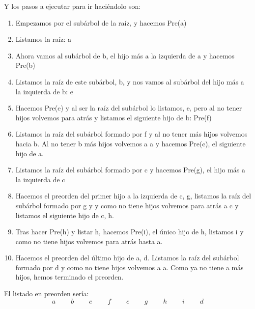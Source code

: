 \documentclass[10pt,a4paper,spanish]{report}
\begin{document}
\noindent
Y los pasos a ejecutar para ir haciéndolo son:
\begin{enumerate}[1.]
\item Empezamos por el subárbol de la raíz, y hacemos Pre(a)
\item Listamos la raíz: a
\item Ahora vamos al subárbol de b, el hijo más a la izquierda de a y hacemos Pre(b)
\item Listamos la raíz de este subárbol, b, y nos vamos al subárbol del hijo más a la izquierda de b: e
\item Hacemos Pre(e) y al ser la raíz del subárbol lo listamos, e, pero al no tener hijos volvemos para atrás y listamos el siguiente hijo de b: Pre(f)
\item Listamos la raíz del subárbol formado por f y al no tener más hijos volvemos hacia b. Al no tener b más hijos volvemos a a y hacemos Pre(c), el siguiente hijo de a.
\item Listamos la raíz del subárbol formado por c y hacemos Pre(g), el hijo más a la izquierda de c
\item Hacemos el preorden del primer hijo a la izquierda de c, g, listamos la raíz del subárbol formado por g y y como no tiene hijos volvemos para atrás a c y listamos el siguiente hijo de c, h.
\item Tras hacer Pre(h) y listar h, hacemos Pre(i), el único hijo de h, listamos i y como no tiene hijos volvemos para atrás hasta a.
\item Hacemos el preorden del último hijo de a, d. Listamos la raíz del subárbol formado por d y como no tiene hijos volvemos a a. Como ya no tiene a más hijos, hemos terminado el preorden.
\end{enumerate}

\noindent
El listado en preorden sería:
\begin{displaymath}
a \qquad\ b \qquad\ e \qquad\ f \qquad\ c \qquad\ g \qquad\ h \qquad\ i \qquad\ d
\end{displaymath}
\end{document}

